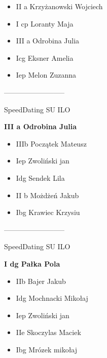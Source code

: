 \documentclass[a4paper,10pt]{article}
\begin{document}
\begin{multicols}{3}
\begin{minipage}[l]{\textwidth}
  \begin{itemize}
    \item II a Krzyżanowski Wojciech
    \item I cp Loranty Maja
    \item III a Odrobina Julia
    \item Icg Eksner Amelia
    \item Iep Melon Zuzanna

    \end{itemize}



\end{minipage}



\begin{minipage}[l]{\textwidth}
--------------------------

  \footnotesize{SpeedDating SU ILO}

  \bfseries{III a Odrobina Julia}

  \begin{itemize}
    \item IIIb Początek Mateusz
    \item Iep Zwoliński jan
    \item Idg Sendek Lila
    \item II b Możdżeń Jakub
    \item Ibg Krawiec Krzysiu

    \end{itemize}



\end{minipage}



\begin{minipage}[l]{\textwidth}
--------------------------

  \footnotesize{SpeedDating SU ILO}

  \bfseries{I dg Pałka Pola}

  \begin{itemize}
    \item IIb Bajer Jakub
    \item Idg Mochnacki Mikołaj
    \item Iep Zwoliński jan
    \item IIe Skoczylas Maciek
    \item Ibg Mrózek mikołaj

    \end{itemize}




\end{minipage}
\end{multicols}
\end{document}
